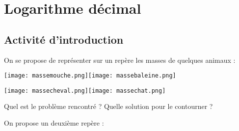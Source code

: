 \documentclass[12pt,a4paper,oneside,dvipsnames,table,svgnames,skins,theorems]{report}
\begin{document}
\ifsectioncours


\chapter{Logarithme décimal}
\setcounter{page}{1}
\vspace{-0.5cm}
\section{Activité d'introduction}

On se propose de représenter sur un repère les masses de quelques animaux :

\begin{center}

\texttt{[image: massemouche.png]}\hspace{0.2cm}\texttt{[image: massebaleine.png]}
\vspace{0.1cm}

\texttt{[image: massecheval.png]}\hspace{0.2cm}\texttt{[image: massechat.png]}

\vspace{1cm}

\end{center}

\vspace{0.5cm}

Quel est le problème rencontré ? Quelle solution pour le contourner ? 
\vspace{0.1cm}


\newpage

On propose un deuxième repère :

\begin{center}
\end{center}
\end{document}
